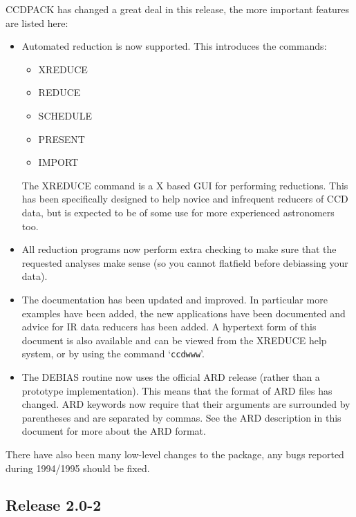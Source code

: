 \documentclass[twoside,11pt]{article}
\newcommand{\htmlref}[2]{#1}
\newcommand{\xref}[3]{#1}
\renewcommand{\_}{\texttt{\symbol{95}}}
\newcommand{\text}[1]{{\small \tt #1}}
\newcommand{\xroutine}[1]{\htmlref{{\sc #1}}{#1}}
\begin{document}
CCDPACK has changed a great deal in this release, the more important
features are listed here:
\begin{itemize}
   \item Automated reduction is now supported. This introduces the commands:
      \begin{itemize}
         \item \xroutine{XREDUCE}
         \item \xroutine{REDUCE}
         \item \xroutine{SCHEDULE}
         \item \xroutine{PRESENT}
        \item \xroutine{IMPORT}
      \end{itemize}
      The \xroutine{XREDUCE} command is a X based GUI for performing
      reductions.  This has been specifically designed to help novice
      and infrequent reducers of CCD data, but is expected to be of
      some use for more experienced astronomers too.

  \item All reduction programs now perform extra checking to make sure
        that the requested analyses make sense (so you cannot flatfield
        before debiassing your data).

  \item The documentation has been updated and improved. In particular
        more examples have been added, the new applications have been
        documented and advice for IR data reducers has been added.
        A hypertext form of this document is also available and can be
        viewed from the \xroutine{XREDUCE} help system, or by using the
        command `\text{ccdwww}'.

  \item The \xroutine{DEBIAS} routine now uses the official
        \xref{ARD}{sun183}{} release (rather than a prototype
        implementation). This means that the format of ARD files has
        changed. ARD keywords now require that their arguments are
        surrounded by parentheses and are separated by commas. See the
        ARD description in this document for more about the ARD format.
\end{itemize}

There have also been many low-level changes to the package, any
bugs reported during 1994/1995 should be fixed.

\subsection{Release 2.0-2}
\end{document}
